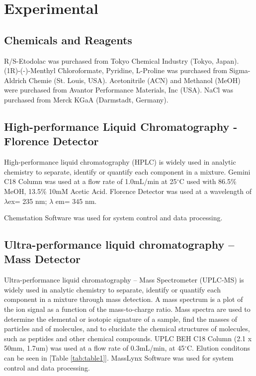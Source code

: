 \documentclass[12pt]{article} %
\begin{document}
\newpage




\section{Experimental}

\subsection{Chemicals and Reagents}
  R/S-Etodolac was purchased from Tokyo Chemical Industry (Tokyo, Japan).
  (1R)-(-)-Menthyl Chloroformate, Pyridine, L-Proline was purchased from Sigma-Aldrich Chemie (St. Louis, USA).
  Acetonitrile (ACN) and Methanol (MeOH) were purchased from Avantor Performance Materials, Inc (USA).
NaCl was purchased from Merck KGaA (Darmstadt, Germany).

\subsection{High-performance Liquid Chromatography - Florence Detector}
  High-performance liquid chromatography (HPLC) is widely used in analytic chemistry to separate, identify or quantify each component in a mixture. Gemini C18 Column was used at a flow rate of 1.0mL/min at 25$^{\circ}$C  used with 86.5\% MeOH, 13.5\% 10mM Acetic Acid.
  Florence Detector was used at a wavelength of $\lambda$ex= 235 nm; $\lambda$ em= 345 nm.

  Chemstation Software was used for system control and data processing.


\subsection{Ultra-performance liquid chromatography – Mass Detector}

  Ultra-performance liquid chromatography – Mass Spectrometer (UPLC-MS) is widely used in analytic chemistry to separate, identify or quantify each component in a mixture through mass detection. A mass spectrum is a plot of the ion signal as a function of the mass-to-charge ratio. Mass spectra are used to determine the elemental or isotopic signature of a sample, find the masses of particles and of molecules, and to elucidate the chemical structures of molecules, such as peptides and other chemical compounds. UPLC BEH C18 Column (2.1 x 50mm, 1.7um) was used at a flow rate of 0.3mL/min, at 45$^{\circ}$C. Elution conditons can be seen in [Table \ref{tab:table1}]. MassLynx Software was used for system control and data processing.
\end{document}

